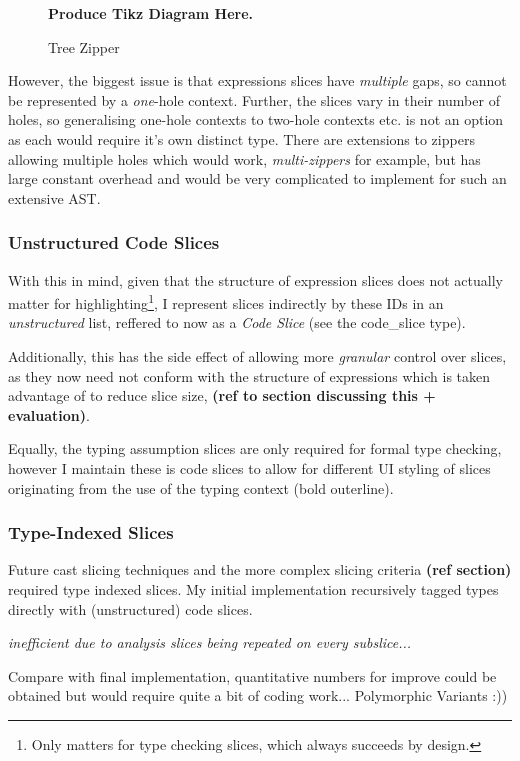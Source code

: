\begin{figure}[h]
\textbf{Produce Tikz Diagram Here.}
\caption{Tree Zipper}
\label{fig:PersistentZipper}
\end{figure}

However, the biggest issue is that expressions slices have \textit{multiple} gaps, so cannot be represented by a \textit{one}-hole context. Further, the slices vary in their number of holes, so generalising one-hole contexts to two-hole contexts etc. is not an option as each would require it's own distinct type. There are extensions to zippers allowing multiple holes which would work, \textit{multi-zippers} \cite{MultiZipper} for example, but has large constant overhead and would be very complicated to implement for such an extensive AST.

\subsubsection{Unstructured Code Slices}
With this in mind, given that the structure of expression slices does not actually matter for highlighting\footnote{Only matters for type checking slices, which always succeeds by design.}, I represent slices indirectly by these IDs in an \textit{unstructured} list, reffered to now as a \textit{Code Slice} (see the code_slice type).

 Additionally, this has the side effect of allowing more \textit{granular} control over slices, as they now need not conform with the structure of expressions which is taken advantage of to reduce slice size, \textbf{(ref to section discussing this + evaluation)}.

Equally, the typing assumption slices are only required for formal type checking, however I maintain these is code slices to allow for different UI styling of slices originating from the use of the typing context (bold outerline).

\subsubsection{Type-Indexed Slices}
Future cast slicing techniques and the more complex slicing criteria \textbf{(ref section)} required type indexed slices. My initial implementation recursively tagged types directly with (unstructured) code slices.

\textit{inefficient due to analysis slices being repeated on every subslice...}

Compare with final implementation, quantitative numbers for improve could be obtained but would require quite a bit of coding work... Polymorphic Variants :))


